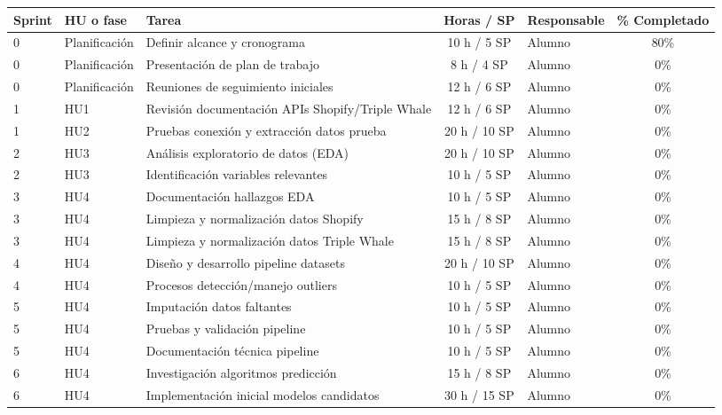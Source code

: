 \documentclass[
11pt, %
]{charter}
\begin{document}
\begin{table}[htpb]
\centering
\begin{tabularx}{\linewidth}{@{}|l|l|X|c|l|c|@{}}
\hline
\rowcolor[HTML]{C0C0C0}
Sprint & HU o fase & Tarea & Horas / SP & Responsable & \% Completado \\ \hline
0 & Planificación & Definir alcance y cronograma & 10 h / 5 SP & Alumno & 80\% \\ \hline
0 & Planificación & Presentación de plan de trabajo & 8 h / 4 SP & Alumno & 0\% \\ \hline
0 & Planificación & Reuniones de seguimiento iniciales & 12 h / 6 SP & Alumno & 0\% \\ \hline
1 & HU1 & Revisión documentación APIs Shopify/Triple Whale & 12 h / 6 SP & Alumno & 0\% \\ \hline
1 & HU2 & Pruebas conexión y extracción datos prueba & 20 h / 10 SP & Alumno & 0\% \\ \hline
2 & HU3 & Análisis exploratorio de datos (EDA) & 20 h / 10 SP & Alumno & 0\% \\ \hline
2 & HU3 & Identificación variables relevantes & 10 h / 5 SP & Alumno & 0\% \\ \hline
3 & HU4 & Documentación hallazgos EDA & 10 h / 5 SP & Alumno & 0\% \\ \hline
3 & HU4 & Limpieza y normalización datos Shopify & 15 h / 8 SP & Alumno & 0\% \\ \hline
3 & HU4 & Limpieza y normalización datos Triple Whale & 15 h / 8 SP & Alumno & 0\% \\ \hline
4 & HU4 & Diseño y desarrollo pipeline datasets & 20 h / 10 SP & Alumno & 0\% \\ \hline
4 & HU4 & Procesos detección/manejo outliers & 10 h / 5 SP & Alumno & 0\% \\ \hline
5 & HU4 & Imputación datos faltantes & 10 h / 5 SP & Alumno & 0\% \\ \hline
5 & HU4 & Pruebas y validación pipeline & 10 h / 5 SP & Alumno & 0\% \\ \hline
5 & HU4 & Documentación técnica pipeline & 10 h / 5 SP & Alumno & 0\% \\ \hline
6 & HU4 & Investigación algoritmos predicción & 15 h / 8 SP & Alumno & 0\% \\ \hline
6 & HU4 & Implementación inicial modelos candidatos & 30 h / 15 SP & Alumno & 0\% \\ \hline
\end{tabularx}
\end{table}
\end{document}
